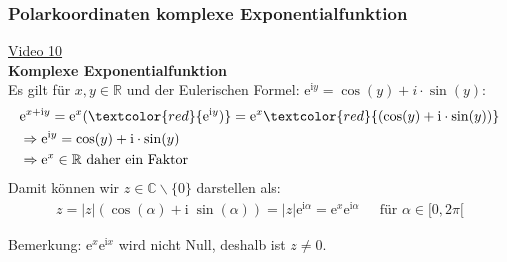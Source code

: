 \subsubsection{Polarkoordinaten komplexe Exponentialfunktion}
\href{https://youtu.be/5P0a9p3mMw8}{Video 10}\\
\textbf{Komplexe  Exponentialfunktion}\\
Es gilt für $ x,y\in \mathbb{R}  $ und der Eulerischen Formel: $ \mathrm{e}^{\mathrm{i}y}=\cos(y)+i\cdot \sin(y) $: \\
\begin{align*}
&\mathrm{e}^{x+\mathrm{i}y}=\mathrm{e}^x(\textcolor{red}{\mathrm{e}^{\mathrm{i}y})}=\mathrm{e}^x\textcolor{red}{(\cos(y)+\mathrm{i} \cdot \sin(y))}\\
&\Rightarrow \mathrm{e}^{\mathrm{i}y}=\cos(y)+\mathrm{i}\cdot \sin(y)\\
&\Rightarrow \mathrm{e}^x \in \mathbb{R} \text{ daher ein Faktor}\\
\end{align*}
Damit können wir $ z\in \mathbb{C} \backslash \{0\} $ darstellen als:\\
\begin{align*}
z=|z|(\cos(\alpha)+\mathrm{i}\;\sin(\alpha))=|z|\mathrm{e}^{\mathrm{i}\alpha}=\mathrm{e}^x\mathrm{e}^{\mathrm{i}\alpha}\;\;\;\; \text{   für } \alpha \in [0,2\pi[
\end{align*}
\begin{center}





\end{center}
Bemerkung: $\mathrm{e}^x\mathrm{e}^{\mathrm{i}x}$ wird nicht Null, deshalb ist $ z\neq 0 $.

